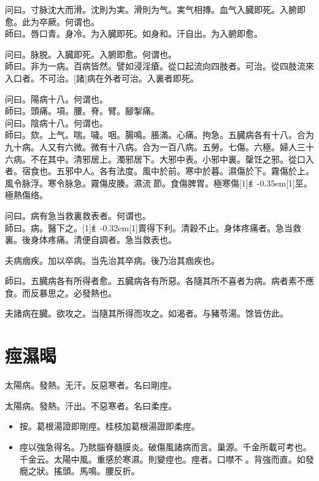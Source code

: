 \documentclass[11pt,oneside,b5paper]{ctexbook}
\begin{document}
\begin{flushleft}
问曰。寸脉沈大而滑。沈則为実。滑則为气。実气相摶。血气入臓即死。入腑即愈。此为卒厥。何谓也。\\
師曰。唇口青。身冷。为入臓即死。如身和。汗自出。为入腑即愈。

问曰。脉脱。入臓即死。入腑即愈。何谓也。\\
師曰。非为一病。百病皆然。譬如浸淫瘡。從口起流向四肢者。可治。從四肢流來入口者。不可治。[諸]病在外者可治。入裏者即死。

问曰。陽病十八。何谓也。\\
師曰。頭痛。項。腰。脊。臂。腳掣痛。\\
问曰。陰病十八。何谓也。\\
師曰。欬。上气。喘。噦。咽。腸鳴。脹滿。心痛。拘急。五臓病各有十八。合为九十病。人又有六微。微有十八病。合为一百八病。五勞。七傷。六極。婦人三十六病。不在其中。清邪居上。濁邪居下。大邪中表。小邪中裏。䅽饪之邪。從口入者。宿食也。五邪中人。各有法度。風中於前。寒中於暮。濕傷於下。霧傷於上。風令脉浮。寒令脉急。霧傷皮腠。濕流{𬮦}節。食傷脾胃。極寒傷{\hbox{\scalebox{0.68}[1]{纟}\kern-0.35em\scalebox{0.64}[1]{巠}}}。極熱傷络。

问曰。病有急当救裏救表者。何谓也。\\
師曰。病。醫下之。{\hbox{\scalebox{0.6}[1]{纟}\kern-0.32em\scalebox{0.7}[1]{賣}}}得下利。清穀不止。身体疼痛者。急当救裏。後身体疼痛。清便自調者。急当救表也。

夫病痼疾。加以卒病。当先治其卒病。後乃治其痼疾也。

師曰。五臓病各有所得者愈。五臓病各有所惡。各隨其所不喜者为病。病者素不應食。而反暴思之。必發熱也。

夫諸病在臓。欲攻之。当隨其所得而攻之。如渴者。与豬苓湯。馀皆仿此。

\chapter{痙濕暍}

太陽病。發熱。无汗。反惡寒者。名曰剛痙。

太陽病。發熱。汗出。不惡寒者。名曰柔痙。

\begin{itemize}
\item 按。葛根湯證即剛痙。桂枝加葛根湯證即柔痙。
\item 痙以強急得名。乃賅腦脊髓膜炎。破傷風諸病而言。巢源。千金所載可考也。千金云。太陽中風。重感於寒濕。則變痙也。痙者。口噤不{𫔭}。背強而直。如發癇之狀。搖頭。馬鳴。腰反折。
\end{itemize}


\end{flushleft}
\end{document}
